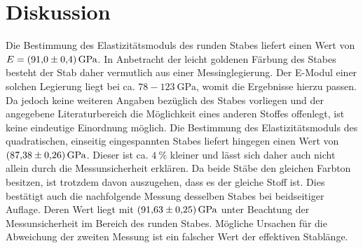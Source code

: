 
\section{Diskussion}
\label{sec:Diskussion}
Die Bestimmung des Elastizitätsmoduls des runden Stabes liefert einen Wert von
 $E = \SI{91.0 \pm 0.4}{\giga\pascal}$. In Anbetracht der leicht goldenen Färbung
  des Stabes besteht der Stab daher vermutlich aus einer Messinglegierung. Der
  E-Modul einer solchen Legierung liegt bei ca. $78 - \SI{123}{\giga\pascal}$\cite{Elastizitätsmodul},
   womit die Ergebnisse hierzu passen.
  Da jedoch keine weiteren Angaben bezüglich des Stabes vorliegen und der
  angegebene Literaturbereich die Möglichkeit eines anderen Stoffes offenlegt,
  ist keine eindeutige Einordnung möglich. Die Bestimmung des Elastizitätsmoduls
   des quadratischen, einseitig eingespannten Stabes liefert hingegen einen Wert
    von $\SI{87.38 \pm 0.26}{\giga\pascal}$. Dieser ist ca. $\SI{4}{\percent}$ kleiner und lässt sich daher auch
    nicht allein durch die Messunsicherheit erklären. Da beide Stäbe den gleichen Farbton
     besitzen, ist trotzdem davon auszugehen, dass es der gleiche Stoff ist. Dies bestätigt auch
      die nachfolgende Messung desselben Stabes bei beidseitiger Auflage. Deren Wert liegt mit $\SI{91.63 \pm 0.25}{\giga\pascal}$ unter Beachtung
       der Messunsicherheit im Bereich des runden Stabes. Mögliche Ursachen
         für die Abweichung der zweiten Messung ist ein falscher Wert der
         effektiven Stablänge.
